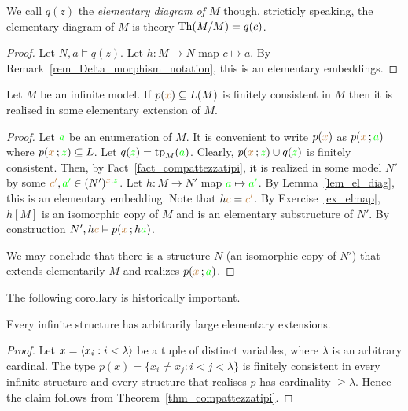  We call $q(z)$ the \emph{elementary diagram of $M$} though, stricticly speaking, the elementary diagram of $M$ is theory ${\rm Th}(M/M)=q(c)$.

\vspace*{-\parskip}
\begin{proof}
    Let $N,a\models q(z)$.
    Let $h:M\to N$ map $c\mapsto a$.
    By Remark~\ref{rem_Delta_morphism_notation}, this is an elementary embeddings.
\end{proof}

\begin{void}\label{thm_compattezzatipi}
    Let $M$ be an infinite model.
    If $p({\color{brown} x})\subseteq L(M)$ is finitely consistent in $M$ then it is realised in some elementary extension of $M$.
\end{void}

\begin{proof}
  Let ${\color{green} a}$ be an enumeration of $M$.
  It is convenient to write $p({\color{brown} x})$ as $p({\color{brown} x}\,;{\color{green} a})$ where $p({\color{brown} x}\,;{\color{green} z})\subseteq L$.
  Let $q({\color{green} z})={\rm tp}_M({\color{green} a})$.
  Clearly, $p({\color{brown} x}\,;{\color{green} z})\cup q({\color{green} z})$ is finitely consistent.
  Then, by Fact~\ref{fact_compattezzatipi}, it is realized in some model $N'$ by some ${\color{brown} c'},{\color{green} a'}\in (N')^{{\color{brown} x},{\color{green} z}}$.
  Let $h:M\to N'$ map ${\color{green} a}\mapsto {\color{green}a'}$.
  By Lemma~\ref{lem_el_diag}, this is an elementary embedding.
  Note that $h{\color{brown} c}={\color{brown} c'}$.
  By Exercise~\ref{ex_elmap}, $h[M]$ is an isomorphic copy of $M$ and is an elementary substructure of $N'$.
  By construction $N',h{\color{brown} c}\vDash p({\color{brown} x}\,;h{\color{green} a})$.

  We may conclude that there is a structure $N$ (an isomorphic copy of $N'$) that extends elementarily $M$ and realizes $p({\color{brown} x}\,;{\color{green} a})$.
\end{proof}

The following corollary is historically important.

\begin{void}
Every infinite structure has arbitrarily large elementary extensions.
\end{void}

\begin{proof}
Let $x=\langle x_i:i<\lambda\rangle$ be a tuple of distinct variables, where $\lambda$ is an arbitrary cardinal.
The type $p(x)=\big\{x_i\neq x_j: i<j<\lambda\big\}$ is finitely consistent in every infinite structure and every structure that realises $p$ has cardinality $\ge\lambda$.
Hence the claim follows from Theorem~\ref{thm_compattezzatipi}.
\end{proof}

